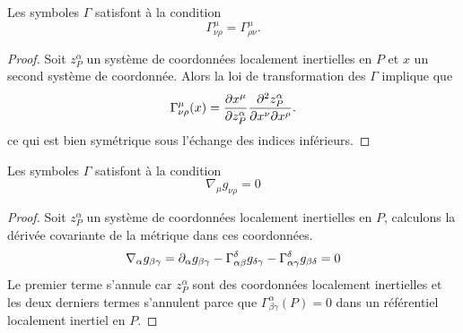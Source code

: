 \documentclass[a4paper,11pt]{report}
\begin{document}
                \begin{prop}\begin{leftbar}
                    Les symboles $\Gamma$ satisfont à la condition
                    \begin{equation}
                        \Gamma^\mu_{\nu\rho} = \Gamma^\mu_{\rho\nu}.
                    \end{equation}
                \end{leftbar}\end{prop}
                
                \begin{proof}
                    Soit $z^\alpha_P$ un système de coordonnées localement inertielles en $P$ et $x$ un second système de coordonnée. Alors la loi de transformation des $\Gamma$ implique que
                    \begin{equation}
                        \Gamma^\mu_{\nu\rho}(x) = \pdv{x^\mu}{z^\alpha_P}\pdv{z^\alpha_P}{x^\nu}{x^\rho}.
                    \end{equation}
                    ce qui est bien symétrique sous l'échange des indices inférieurs.
                \end{proof}
                
                \begin{prop}\begin{leftbar}
                    Les symboles $\Gamma$ satisfont à la condition
                    \begin{equation}
                        \nabla_\mu g_{\nu\rho} = 0
                    \end{equation}
                \end{leftbar}\end{prop}
                
                \begin{proof}
                    Soit $z^\alpha_P$ un système de coordonnées localement inertielles en $P$, calculons la dérivée covariante de la métrique dans ces coordonnées.
                    \begin{equation}
                        \nabla_\alpha g_{\beta\gamma} = \partial_\alpha g_{\beta\gamma} - \Gamma^\delta_{\alpha\beta}g_{\delta\gamma} - \Gamma^\delta_{\alpha\gamma}g_{\beta\delta} = 0
                    \end{equation}
                    Le premier terme s'annule car $z^\alpha_P$ sont des coordonnées localement inertielles et les deux derniers termes s'annulent parce que  $\Gamma^\alpha_{\beta\gamma}(P) = 0$ dans un référentiel localement inertiel en $P$.
                \end{proof}
                
\end{document}
